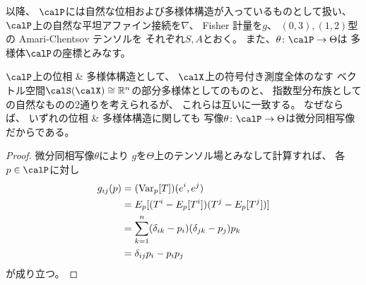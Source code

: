 \documentclass[report]{jlreq}
\begin{document}
以降、
$\calP$には自然な位相および多様体構造が入っているものとして扱い、
$\calP$上の自然な平坦アファイン接続を$\nabla$、
Fisher 計量を$g$、
$(0, 3), (1, 2)$型の Amari-Chentsov テンソルを
それぞれ$S, A$とおく。
また、$\theta \colon \calP \to \Theta$は
多様体$\calP$の座標とみなす。

\begin{remark}
    $\calP$上の位相 \& 多様体構造として、
    $\calX$上の符号付き測度全体のなす
    ベクトル空間$\calS(\calX) \cong \R^n$の部分多様体としてのものと、
    指数型分布族としての自然なものの2通りを考えられるが、
    これらは互いに一致する。
    なぜならば、
    いずれの位相 \& 多様体構造に関しても
    写像$\theta \colon \calP \to \Theta$は微分同相写像だからである。
\end{remark}


\begin{proof}
    微分同相写像$\theta$により
    $g$を$\Theta$上のテンソル場とみなして計算すれば、
    各$p \in \calP$に対し
    \begin{alignat}{1}
        g_{ij}(p)
            &=
                (\operatorname{Var}_p [T])(e^i, e^j)
                \\
            &=
                E_p[(T^i - E_p[T^i])(T^j - E_p[T^j])]
                \\
            &=
                \sum_{k = 1}^n
                    (\delta_{ik} - p_i)
                    (\delta_{jk} - p_j)
                    p_k
                \\
            &=
                \delta_{ij} p_i - p_i p_j
    \end{alignat}
    が成り立つ。
\end{proof}

\end{document}
